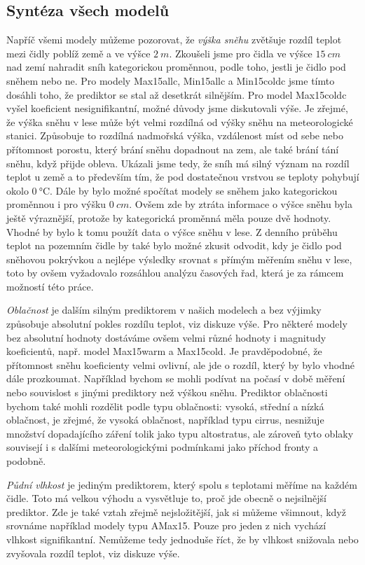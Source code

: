 \subsection{Syntéza všech modelů}
Napříč všemi modely můžeme pozorovat, že \textit{výška sněhu} zvětšuje rozdíl teplot mezi čidly poblíž země a ve výšce $\SI{2}{m}$. Zkoušeli jsme pro čidla ve výšce $\SI{15}{cm}$ nad zemí nahradit sníh kategorickou proměnnou, podle toho, jestli je čidlo pod sněhem nebo ne. Pro modely Max15allc, Min15allc a Min15coldc jsme tímto dosáhli toho, že prediktor se stal až desetkrát silnějším. Pro model Max15coldc vyšel koeficient nesignifikantní, možné důvody jsme diskutovali výše. Je zřejmé, že výška sněhu v lese může být velmi rozdílná od výšky sněhu na meteorologické stanici. Způsobuje to rozdílná nadmořská výška, vzdálenost míst od sebe nebo přítomnost porostu, který brání sněhu dopadnout na zem, ale také brání tání sněhu, když přijde obleva. Ukázali jsme tedy, že sníh má silný význam na rozdíl teplot u země a to především tím, že pod dostatečnou vrstvou se teploty pohybují okolo $\SI{0}{\celsius}$. Dále by bylo možné spočítat modely se sněhem jako kategorickou proměnnou i pro výšku $\SI{0}{cm}$. Ovšem zde by ztráta informace o výšce sněhu byla ještě výraznější, protože by kategorická proměnná měla pouze dvě hodnoty. Vhodné by bylo k tomu použít data o výšce sněhu v lese. Z denního průběhu teplot na pozemním čidle by také bylo možné zkusit odvodit, kdy je čidlo pod sněhovou pokrývkou a nejlépe výsledky srovnat s přímým měřením sněhu v lese, toto by ovšem vyžadovalo rozsáhlou analýzu časových řad, která je za rámcem možností této práce.

\textit{Oblačnost} je dalším silným prediktorem v našich modelech a bez výjimky způsobuje absolutní pokles rozdílu teplot, viz diskuze výše. Pro některé modely bez absolutní hodnoty dostáváme ovšem velmi různé hodnoty i magnitudy koeficientů, např. model Max15warm a Max15cold. Je pravděpodobné, že přítomnost sněhu koeficienty velmi ovlivní, ale jde o rozdíl, který by bylo vhodné dále prozkoumat. Například bychom se mohli podívat na počasí v době měření nebo souvislost s jinými prediktory než výškou sněhu. Prediktor oblačnosti bychom také mohli rozdělit podle typu oblačnosti: vysoká, střední a nízká oblačnost, je zřejmé, že vysoká oblačnost, například typu cirrus, nesnižuje množství dopadajícího záření tolik jako typu altostratus, ale zároveň tyto oblaky souvisejí i s dalšími meteorologickými podmínkami jako příchod fronty a podobně.

\textit{Půdní vlhkost} je jediným prediktorem, který spolu s teplotami měříme na každém čidle. Toto má velkou výhodu a vysvětluje to, proč jde obecně o nejsilnější prediktor. Zde je také vztah zřejmě nejsložitější, jak si můžeme všimnout, když srovnáme například modely typu AMax15. Pouze pro jeden z nich vychází vlhkost signifikantní. Nemůžeme tedy jednoduše říct, že by vlhkost snižovala nebo zvyšovala rozdíl teplot, viz diskuze výše.

